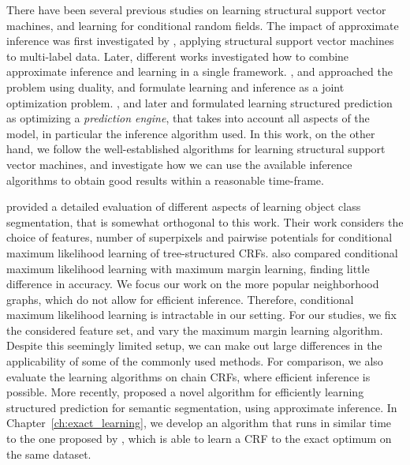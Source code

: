 There have been several previous studies on learning structural support vector
machines, and learning for conditional random fields. The impact of approximate
inference was first investigated by \citet{finley2008training}, applying
structural support vector machines to multi-label data. Later, different works
investigated how to combine approximate inference and learning in a single
framework. \citet{meshi2010learning, komodakis2011efficient}, and
\citet{hazan2010primal} approached the problem using duality, and formulate
learning and inference as a joint optimization problem.
\citet{stoyanov2011empirical}, and later \citet{jancsarylearning} and
\citet{krahenbuhlparameter} formulated learning structured prediction as
optimizing a \emph{prediction engine}, that takes into account all aspects of
the model, in particular the inference algorithm used.
In this work, on the other hand, we follow the well-established algorithms for
learning structural support vector machines, and investigate how we can use the
available inference algorithms to obtain good results within a reasonable
time-frame.

\citet{nowozin2010parameter} provided a detailed evaluation of different aspects
of learning object class segmentation, that is somewhat orthogonal to this
work. Their work considers the choice of features, number of superpixels and
pairwise potentials for conditional maximum likelihood learning of
tree-structured CRFs.  \citet{nowozin2010parameter} also compared conditional
maximum likelihood learning with maximum margin learning, finding little
difference in accuracy.
We focus our work on the more popular neighborhood graphs, which do not allow
for efficient inference.  Therefore, conditional maximum likelihood learning is
intractable in our setting. For our studies, we fix the considered feature set,
and vary the maximum margin learning algorithm. Despite this seemingly limited
setup, we can make out large differences in the applicability of some of the
commonly used methods. For comparison, we also evaluate the learning algorithms
on chain CRFs, where efficient inference is possible.
More recently, \citet{lucchi2013learning} proposed a novel algorithm for
efficiently learning structured prediction for semantic segmentation, using
approximate inference. In Chapter~\ref{ch:exact_learning}, we develop an
algorithm that runs in similar time to the one proposed by
\citet{lucchi2013learning}, which is able to learn a CRF to the exact optimum on
the same dataset.


